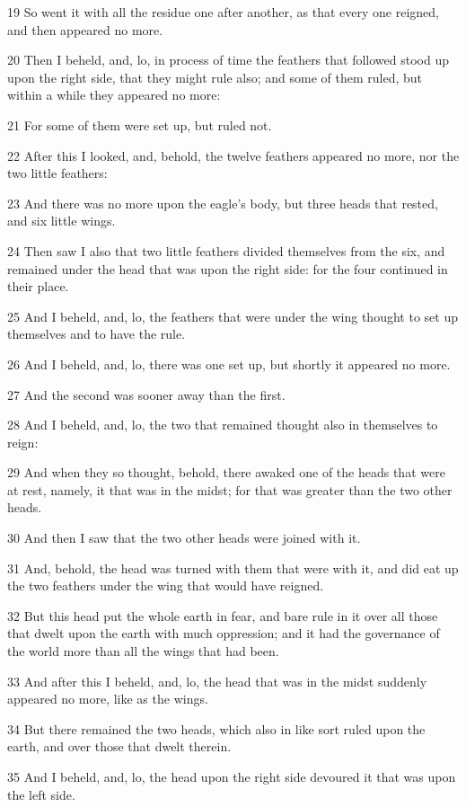 \par 19 So went it with all the residue one after another, as that every one reigned, and then appeared no more.
\par 20 Then I beheld, and, lo, in process of time the feathers that followed stood up upon the right side, that they might rule also; and some of them ruled, but within a while they appeared no more:
\par 21 For some of them were set up, but ruled not.
\par 22 After this I looked, and, behold, the twelve feathers appeared no more, nor the two little feathers:
\par 23 And there was no more upon the eagle's body, but three heads that rested, and six little wings.
\par 24 Then saw I also that two little feathers divided themselves from the six, and remained under the head that was upon the right side: for the four continued in their place.
\par 25 And I beheld, and, lo, the feathers that were under the wing thought to set up themselves and to have the rule.
\par 26 And I beheld, and, lo, there was one set up, but shortly it appeared no more.
\par 27 And the second was sooner away than the first.
\par 28 And I beheld, and, lo, the two that remained thought also in themselves to reign:
\par 29 And when they so thought, behold, there awaked one of the heads that were at rest, namely, it that was in the midst; for that was greater than the two other heads.
\par 30 And then I saw that the two other heads were joined with it.
\par 31 And, behold, the head was turned with them that were with it, and did eat up the two feathers under the wing that would have reigned.
\par 32 But this head put the whole earth in fear, and bare rule in it over all those that dwelt upon the earth with much oppression; and it had the governance of the world more than all the wings that had been.
\par 33 And after this I beheld, and, lo, the head that was in the midst suddenly appeared no more, like as the wings.
\par 34 But there remained the two heads, which also in like sort ruled upon the earth, and over those that dwelt therein.
\par 35 And I beheld, and, lo, the head upon the right side devoured it that was upon the left side.

